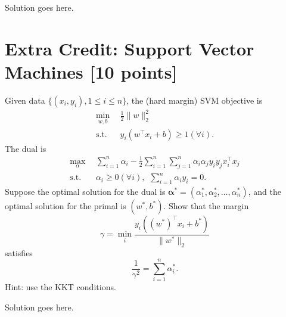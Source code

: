 \documentclass[a4paper]{article}
\theoremstyle{definition}
\newenvironment{soln}{
    \leavevmode\color{blue}\ignorespaces
}{}
\begin{document}
\begin{soln}  Solution goes here. \end{soln}


\section{Extra Credit: Support Vector Machines [10 points]} 
Given data $\{(x_i,y_i), 1\le i \le n\}$, the (hard margin) SVM objective is 
\begin{align*}
\min_{w,b} & ~~\frac{1}{2} \|w \|_2^2 \\
\text{s.t.} & ~~y_i(w^\top x_i + b) \ge 1 (\forall i). 
\end{align*}
The dual is 
\begin{align*}
\max_{\alpha} & ~~\sum_{i=1}^n \alpha_i - \frac{1}{2}  \sum_{i=1}^n  \sum_{j=1}^n \alpha_i \alpha_j y_i y_j x_i^\top x_j \\
\text{s.t.} & ~~
\alpha_i \geq 0 (\forall i),~~\sum_{i=1}^n \alpha_i y_i = 0.
\end{align*}
Suppose the optimal solution for the dual is $\mathbf{\alpha^*} = (\alpha^*_1, \alpha^*_2, \dots, \alpha^*_n)$, and the optimal solution for the primal is $(w^*, b^*)$. Show that the margin 
$$
\gamma = \min_i \frac{y_i ((w^*)^\top x_i + b^*)}{\|w^*\|_2}
$$ 
satisfies
\[
\frac{1}{\gamma^2}  = \sum_{i=1}^n \alpha^*_i.
\]
Hint: use the KKT conditions. 


\begin{soln}  Solution goes here. \end{soln}
\end{document}
